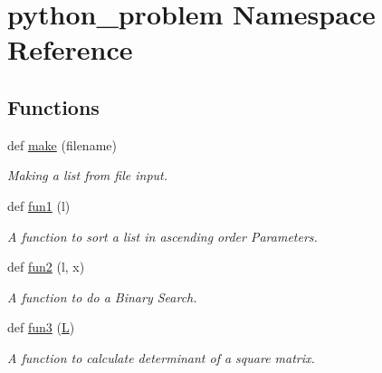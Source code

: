\hypertarget{namespacepython__problem}{}\section{python\+\_\+problem Namespace Reference}
\label{namespacepython__problem}
\subsection*{Functions}
\begin{DoxyCompactItemize}
\item 
def \hyperlink{namespacepython__problem_a3e14eabd673d5450fc9ad0f55944ddbc}{make} (filename)
\begin{DoxyCompactList}\small\item\em Making a list from file input. \end{DoxyCompactList}\item 
def \hyperlink{namespacepython__problem_aa5fcea23fc1ba14c5e21dfeb25a73376}{fun1} (l)
\begin{DoxyCompactList}\small\item\em A function to sort a list in ascending order Parameters. \end{DoxyCompactList}\item 
def \hyperlink{namespacepython__problem_aeb8631d95a0e5c21716de1efa0a93f88}{fun2} (l, x)
\begin{DoxyCompactList}\small\item\em A function to do a Binary Search. \end{DoxyCompactList}\item 
def \hyperlink{namespacepython__problem_aecd5932c95cd5087a63f7a9cdd9a9261}{fun3} (\hyperlink{namespacepython__problem_a57cd50d64eeaf609bf3db7738032930d}{L})
\begin{DoxyCompactList}\small\item\em A function to calculate determinant of a square matrix. \end{DoxyCompactList}\end{DoxyCompactItemize}
